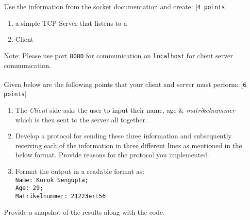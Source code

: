 \documentclass{WeSTassignment}
\begin{document}
Use the information from the \href{https://docs.python.org/3/howto/sockets.html}{socket} documentation and create: [\texttt{4 points}]
\begin{enumerate}
\item a simple TCP Server that listens to a
\item Client
\end{enumerate}
\underline{Note:} Please use port \texttt{8080} for communication on \texttt{localhost} for client server communication.\\ \\
Given below are the following points that your client and server must perform: [\texttt{6 points}]
\begin{enumerate}
\item The \emph{Client} side asks the user to input their name, age \& \emph{matrikelnummer} which is then sent to the server all together.
\item Develop a protocol for sending these three information and subsequently receiving each of the information in three different lines as mentioned in the below format. Provide reasons for the protocol you implemented. 
\item Format the output in a readable format as:\texttt{\\ Name: Korok Sengupta; \\ Age: 29; \\ Matrikelnummer: 21223ert56}
\end{enumerate}

Provide a snapshot of the results along with the code. \\





\makefooter
\end{document}
